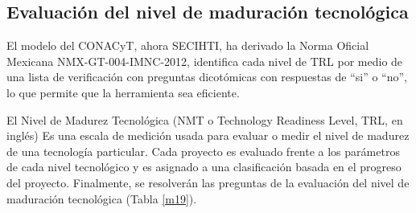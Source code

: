 \subsection{Evaluación del nivel de maduración tecnológica}

El modelo del CONACyT, ahora SECIHTI, ha derivado la Norma Oficial Mexicana NMX-GT-004-IMNC-2012, identifica cada nivel de TRL por medio de una lista de verificación con preguntas dicotómicas con respuestas de ``si'' o ``no'', lo que permite que la herramienta sea eficiente.


El Nivel de Madurez Tecnológica (NMT o Technology Readiness Level, TRL, en inglés) 
Es una escala de medición usada para evaluar o medir el nivel de madurez de una
tecnología particular. Cada proyecto es evaluado frente a los parámetros de cada
nivel tecnológico y es asignado a una clasificación basada en el progreso del
proyecto. Finalmente, se resolverán las preguntas de la evaluación del nivel de maduración tecnológica (Tabla \ref{m19}).

